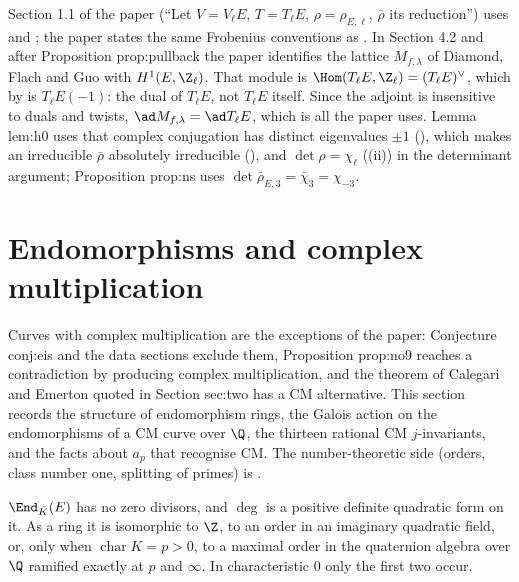 \begin{paperlink}\label{pl:ellcurves:section11}
Section 1.1 of the paper (``Let $V=V_\ell E$, $T=T_\ell E$, $\rho=\rho_{E,\ell}$, $\bar\rho$ its reduction'') uses  and
; the paper states the same Frobenius conventions as . In Section 4.2 and after
Proposition prop:pullback the paper identifies the lattice $M_{f,\lambda}$ of Diamond, Flach and Guo with $H^1(E,\Z_\ell)$. That module is
$\Hom(T_\ell E,\Z_\ell)=(T_\ell E)^\vee$, which by  is $T_\ell E(-1)$: the dual of $T_\ell E$, not $T_\ell E$ itself. Since the adjoint is insensitive to
duals and twists, $\ad M_{f,\lambda}=\ad T_\ell E$, which is all the paper uses. Lemma lem:h0 uses that complex conjugation has distinct eigenvalues $\pm1$
(), which makes an irreducible $\bar\rho$ absolutely irreducible (), and $\det\rho=\chi_\ell$ ((ii)) in the
determinant argument; Proposition prop:ns uses $\det\bar\rho_{E,3}=\bar\chi_3=\chi_{-3}$.
\end{paperlink}

\section{Endomorphisms and complex multiplication}\label{sec:ellcurves:cm}

Curves with complex multiplication are the exceptions of the paper: Conjecture conj:eis and the data sections exclude them, Proposition prop:no9 reaches a
contradiction by producing complex multiplication, and the theorem of Calegari and Emerton quoted in Section sec:two has a CM alternative. This section
records the structure of endomorphism rings, the Galois action on the endomorphisms of a CM curve over $\Q$, the thirteen rational CM $j$-invariants, and the
facts about $a_p$ that recognise CM. The number-theoretic side (orders, class number one, splitting of primes) is .

\begin{theorem}\label{thm:ellcurves:end}
$\End_{\bar K}(E)$ has no zero divisors, and $\deg$ is a positive definite quadratic form on it. As a ring it is isomorphic to $\Z$, to an order in an
imaginary quadratic field, or, only when $\operatorname{char}K=p>0$, to a maximal order in the quaternion algebra over $\Q$ ramified exactly at $p$ and $\infty$. In
characteristic $0$ only the first two occur.
\end{theorem}

